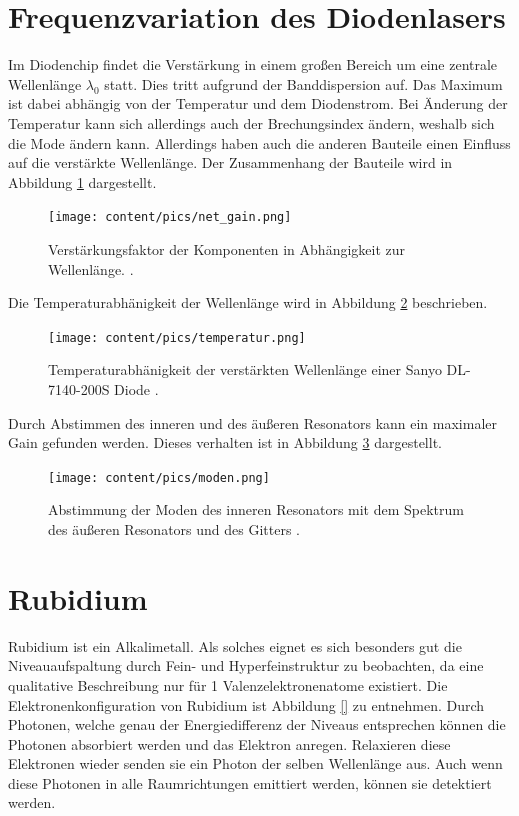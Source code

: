 \section{Frequenzvariation des Diodenlasers}
\label{sec:freq}

Im Diodenchip findet die Verstärkung in einem großen Bereich um eine zentrale Wellenlänge $\lambda_0$ statt. Dies tritt aufgrund der Banddispersion auf. Das Maximum ist dabei 
abhängig von der Temperatur und dem Diodenstrom. Bei Änderung der Temperatur kann sich allerdings auch der Brechungsindex ändern, weshalb sich die Mode ändern kann. Allerdings haben 
auch die anderen Bauteile einen Einfluss auf die verstärkte Wellenlänge. Der Zusammenhang der Bauteile wird in Abbildung \ref{fig:net_gain} dargestellt.

\begin{figure}
    \centering
    \texttt{[image: content/pics/net\_gain.png]}
    \caption{Verstärkungsfaktor der Komponenten in Abhängigkeit zur Wellenlänge. \cite{diode_laser_spectroscopy}.}
    \label{fig:net_gain}
\end{figure}

Die Temperaturabhänigkeit der Wellenlänge wird in Abbildung \ref{fig:temperatur} beschrieben.

\begin{figure}
    \centering
    \texttt{[image: content/pics/temperatur.png]}
    \caption{Temperaturabhänigkeit der verstärkten Wellenlänge einer Sanyo DL-7140-200S Diode \cite{diode_laser_spectroscopy}.}
    \label{fig:temperatur}
\end{figure}

Durch Abstimmen des inneren und des äußeren Resonators kann ein maximaler Gain gefunden werden. Dieses verhalten ist in Abbildung \ref{fig:moden} dargestellt.

\begin{figure}
    \centering
    \texttt{[image: content/pics/moden.png]}
    \caption{Abstimmung der Moden des inneren Resonators mit dem Spektrum des äußeren Resonators und des Gitters \cite{diode_laser_spectroscopy}.}
    \label{fig:moden}
\end{figure}

\section{Rubidium}
\label{sec:rub}

Rubidium ist ein Alkalimetall. Als solches eignet es sich besonders gut die Niveauaufspaltung durch Fein- und Hyperfeinstruktur zu beobachten, da eine qualitative Beschreibung nur 
für 1 Valenzelektronenatome existiert. Die Elektronenkonfiguration von Rubidium ist Abbildung \ref{} zu entnehmen. Durch Photonen, welche genau der Energiedifferenz der Niveaus 
entsprechen können die Photonen absorbiert werden und das Elektron anregen. Relaxieren diese Elektronen wieder senden sie ein Photon der selben Wellenlänge aus. Auch wenn diese 
Photonen in alle Raumrichtungen emittiert werden, können sie detektiert werden.

